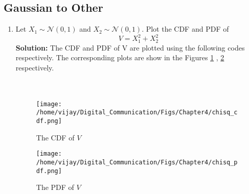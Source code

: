 \documentclass[journal,10pt,twocolumn]{IEEEtran}
\newcounter{Chapcounter}
\numberwithin{equation}{subsection}
\numberwithin{figure}{subsection}
\renewcommand\thesection{\theChapcounter.\arabic{section}}
\newcommand{\solution}{\noindent \textbf{Solution: }}
\providecommand{\gauss}[2]{\mathcal{N}\ensuremath{\left(#1,#2\right)}}
\renewcommand\thesection{\arabic{section}}
\renewcommand\thesubsection{\thesection.\arabic{subsection}}
\begin{document}
\subsection{\textbf{Gaussian to Other}}
\begin{enumerate}[label=\thesubsection.\arabic*,ref=\thesubsection.\arabic{figure}]
\item
Let $X_1 \sim  \gauss{0}{1}$ and $X_2 \sim  \gauss{0}{1}$. Plot the CDF and PDF of
%
\begin{equation}
V = X_1^2 + X_2^2
\end{equation}
\solution 
The CDF and PDF of V are plotted using the following codes respectively. The corresponding plots are show in the Figures \ref{fig:gauss_cdf1} , \ref{fig:gauss_pdf1} respectively.\\

\\	

\\	

\begin{figure}[!ht]
\centering
\texttt{[image: /home/vijay/Digital\_Communication/Figs/Chapter4/chisq\_cdf.png]}  
\caption{The CDF of $V$}
\label{fig:gauss_cdf1}
\end{figure}
\begin{figure}[!ht]
\centering
\texttt{[image: /home/vijay/Digital\_Communication/Figs/Chapter4/chisq\_pdf.png]}   
\caption{The PDF of $V$}
\label{fig:gauss_pdf1}
\end{figure}


\end{enumerate}
\end{document}
